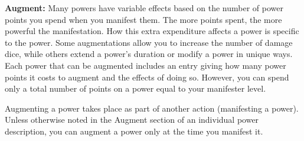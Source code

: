 \documentclass{article}
\begin{document}
\textbf{Augment:} Many powers have variable effects based on the number of power 
points you spend when you manifest them. The more points spent, the more powerful 
the manifestation. How this extra expenditure affects a power is specific to the 
power. Some augmentations allow you to increase the number of damage dice, while 
others extend a power's duration or modify a power in unique ways. Each power that 
can be augmented includes an entry giving how many power points it costs to augment 
and the effects of doing so. However, you can spend only a total number of points 
on a power equal to your manifester level.

Augmenting a power takes place as part of another action (manifesting a power). 
Unless otherwise noted in the Augment section of an individual power description, 
you can augment a power only at the time you manifest it.

\newpage
\end{document}
